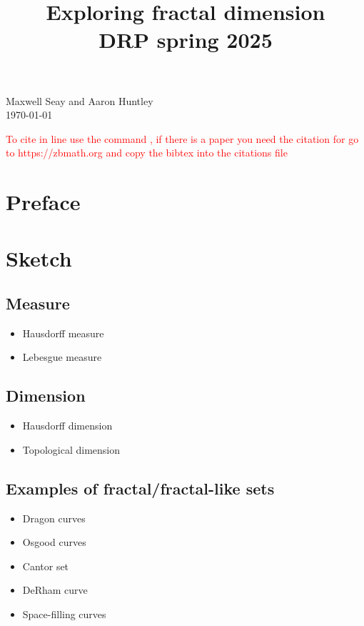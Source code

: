 \documentclass[11pt]{ekblite}
\newcommand\aaron[1]{\textcolor{red}{#1}}
\begin{document}
\title{Exploring fractal dimension\\
DRP spring 2025}
\maketitle
\begin{center}
Maxwell Seay and Aaron Huntley\\
\today
\end{center}

\tableofcontents

\aaron{To cite in line use the command \cite{falconer1}, if there is a paper you need the citation for go to https://zbmath.org and copy the bibtex into the citations file}
\newpage

\section{Preface}
    \section{Sketch}
	\subsection{Measure}
	\begin{itemize}
		\item Hausdorff measure
		\item Lebesgue measure
	\end{itemize}
	\subsection{Dimension}
	\begin{itemize}
		\item Hausdorff dimension
		\item Topological dimension
	\end{itemize}
	\subsection{Examples of fractal/fractal-like sets}
	\begin{itemize}
		\item Dragon curves
		\item Osgood curves
		\item Cantor set
		\item DeRham curve
		\item Space-filling curves
	\end{itemize}
\end{document}
